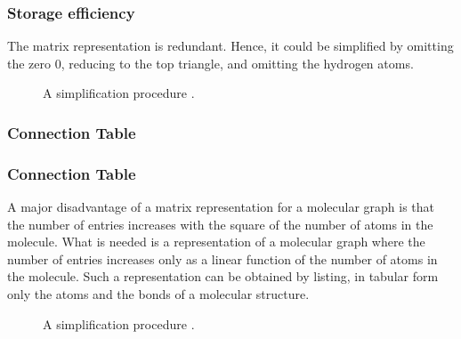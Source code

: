 \documentclass{beamer}
\begin{document}
\begin{frame}
\frametitle{Storage efficiency}
The matrix representation is redundant. Hence, it could be simplified by omitting the zero 0, reducing to the top triangle, and omitting the hydrogen atoms.       
 
\begin{figure}[h!]
\caption{A simplification procedure \cite{gasteiger2006chemoinformatics}.}
\end{figure}
\end{frame}
\subsubsection{Connection Table}
\begin{frame}
\frametitle{Connection Table}
A major disadvantage of a matrix representation for a molecular graph is that the number of entries increases with the square of the number of atoms in the molecule. What is needed is a representation of a molecular graph where the number of
entries increases only as a linear function of the number of atoms in the molecule. Such a representation can be obtained by listing, in tabular form only the atoms and the bonds of a molecular structure.      
 
\begin{figure}[h!]
\caption{A simplification procedure \cite{gasteiger2006chemoinformatics}.}
\end{figure}
\end{frame}
\end{document}
